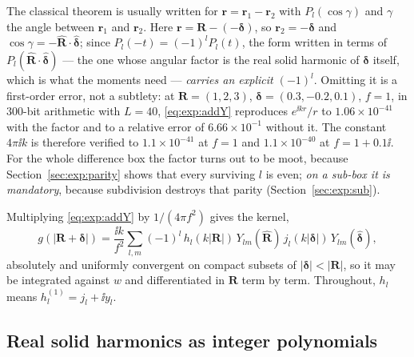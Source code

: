\begin{remark}
\label{rem:exp:sign}
The classical theorem is usually written for $\mathbf{r} = \mathbf{r}_1 - \mathbf{r}_2$
with $P_l(\cos\gamma)$ and $\gamma$ the angle between $\mathbf{r}_1$ and $\mathbf{r}_2$.
Here $\mathbf{r} = \mathbf{R} - (-\boldsymbol{\delta})$, so $\mathbf{r}_2 =
-\boldsymbol{\delta}$ and $\cos\gamma = -\hat{\mathbf{R}}\cdot\hat{\boldsymbol{\delta}}$;
since $P_l(-t) = (-1)^l P_l(t)$, the form written in terms of
$P_l(\hat{\mathbf{R}}\cdot\hat{\boldsymbol{\delta}})$ --- the one whose angular factor is
the real solid harmonic of $\boldsymbol{\delta}$ itself, which is what the moments need
--- \emph{carries an explicit $(-1)^l$}. Omitting it is a first-order error, not a
subtlety: at $\mathbf{R} = (1,2,3)$, $\boldsymbol{\delta} = (0.3,-0.2,0.1)$, $f=1$, in
$300$-bit arithmetic with $L = 40$, \eqref{eq:exp:addY} reproduces $e^{\ii kr}/r$ to
$1.06\times10^{-41}$ with the factor and to a relative error of $6.66\times10^{-1}$
without it. The constant $4\pi\ii k$ is therefore verified to $1.1\times10^{-41}$ at
$f=1$ and $1.1\times10^{-40}$ at $f = 1+0.1\ii$. For the whole difference box the factor
turns out to be moot, because Section~\ref{sec:exp:parity} shows that every surviving $l$
is even; \emph{on a sub-box it is mandatory}, because subdivision destroys that parity
(Section~\ref{sec:exp:sub}).
\end{remark}

Multiplying \eqref{eq:exp:addY} by $1/(4\pi f^2)$ gives the kernel,
\begin{equation}
g(|\mathbf{R}+\boldsymbol{\delta}|)
= \frac{\ii k}{f^2}\sum_{l,m}(-1)^l\,h_l(k|\mathbf{R}|)\,Y_{lm}(\hat{\mathbf{R}})\,
  j_l(k|\boldsymbol{\delta}|)\,Y_{lm}(\hat{\boldsymbol{\delta}}) ,
\label{eq:exp:g}
\end{equation}
absolutely and uniformly convergent on compact subsets of
$|\boldsymbol{\delta}| < |\mathbf{R}|$, so it may be integrated against $w$ and
differentiated in $\mathbf{R}$ term by term. Throughout, $h_l$ means $h_l^{(1)} = j_l +
\ii y_l$.

\subsection{Real solid harmonics as integer polynomials}
\label{sec:exp:solid}

